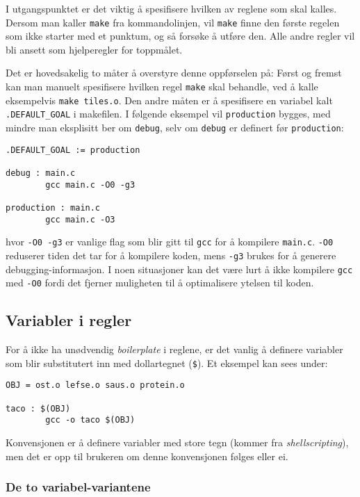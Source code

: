 \begin{alphasection}
I utgangspunktet er det viktig å spesifisere hvilken av reglene som skal kalles. Dersom man kaller \verb|make| fra kommandolinjen, vil \verb|make| finne den første regelen
som ikke starter med et punktum, og så forsøke å utføre den. Alle andre
regler vil bli ansett som hjelperegler for toppmålet.

Det er hovedsakelig to måter å overstyre denne oppførselen på: Først og
fremst kan man manuelt spesifisere hvilken regel \verb|make| skal behandle, ved å
kalle eksempelvis \verb|make tiles.o|. Den andre måten er å spesifisere en variabel kalt \verb|.DEFAULT_GOAL| i makefilen. I følgende eksempel vil \verb|production| bygges, med mindre man eksplisitt ber
om \verb|debug|, selv om \verb|debug| er definert før \verb|production|:

\begin{lstlisting}
.DEFAULT_GOAL := production

debug : main.c
        gcc main.c -O0 -g3

production : main.c
        gcc main.c -O3
\end{lstlisting}

hvor \verb|-O0 -g3| er vanlige flag som blir gitt til \verb|gcc| for å kompilere \verb|main.c|. \verb|-O0| reduserer tiden det tar for å kompilere koden, mens \verb|-g3| brukes for å generere debugging-informasjon. I noen situasjoner kan det være lurt å ikke kompilere \verb|gcc| med \verb|-O0| fordi det fjerner muligheten til å optimalisere ytelsen til koden. 

\subsection{Variabler i regler}

For å ikke ha unødvendig \textit{boilerplate} i reglene, er det vanlig å definere variabler som blir substitutert inn med dollartegnet (\verb|$|). Et eksempel kan sees under:

\begin{lstlisting}
OBJ = ost.o lefse.o saus.o protein.o

taco : $(OBJ)
        gcc -o taco $(OBJ)
\end{lstlisting}

Konvensjonen er å definere variabler med store tegn (kommer fra \textit{shellscripting}), men det er opp til brukeren om denne konvensjonen følges eller ei.

\subsubsection{De to variabel-variantene}


\end{alphasection}
